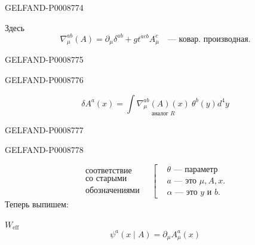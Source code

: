 \begin{GelfandAdjacentEvidence}{GELFAND-P000877}{4}


Здесь
\begin{equation*}
\nabla_\mu^{ab}(A)=\partial_\mu\delta^{ab}+g t^{acb}A_\mu^c
\quad\text{--- ковар. производная.}
\tag{59}
\end{equation*}
\end{GelfandAdjacentEvidence}
\begin{GelfandAdjacentEvidence}{GELFAND-P000877}{5}


\end{GelfandAdjacentEvidence}
\begin{GelfandAdjacentEvidence}{GELFAND-P000877}{6}

\begin{equation*}
\delta A^a(x)=\int\underset{\text{аналог }R}{\nabla_\mu^{ab}(A)(x)}\ \theta^b(y)d^4y
\tag{60}
\end{equation*}
\end{GelfandAdjacentEvidence}
\begin{GelfandAdjacentEvidence}{GELFAND-P000877}{7}


\end{GelfandAdjacentEvidence}
\begin{GelfandAdjacentEvidence}{GELFAND-P000877}{8}

\begin{equation*}
\substack{\text{соответствие}\\\text{со старыми}\\\text{обозначениями}}
\quad\left[\begin{aligned}
&\theta\text{ --- параметр}\\
&a\text{ --- это }\mu,A,x.\\
&\alpha\text{ --- это }y\text{ и }b.
\end{aligned}\right.
\end{equation*}
Теперь выпишем:

$W_{\mathrm{eff}}$
\begin{equation*}
\psi^a(x\mid A)=\partial_\mu A_\mu^a(x)
\tag{61}
\end{equation*}
\end{GelfandAdjacentEvidence}


